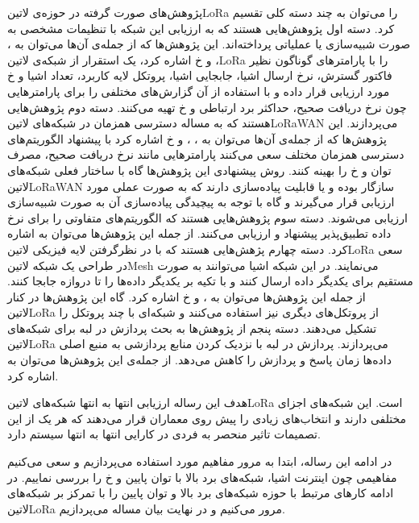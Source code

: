 پژوهش‌های صورت گرفته در حوزه‌ی ‌لاتین{LoRa} را می‌توان به چند دسته کلی تقسیم کرد. دسته اول پژوهش‌هایی هستند که به ارزیابی این شبکه با تنظیمات مشخصی
به صورت شبیه‌سازی یا عملیاتی پرداخته‌اند. این پژوهش‌ها که از جمله‌ی آن‌ها می‌توان به ، ، 
و ‌خ اشاره کرد، یک استقرار از شبکه‌ی ‌لاتین{LoRa}
را با پارامترهای گوناگون نظیر فاکتور گسترش، نرخ ارسال اشیا، جابجایی اشیا، پروتکل لایه کاربرد، تعداد اشیا و ‌خ مورد ارزیابی قرار داده و با استفاده از آن گزارش‌های مختلفی را
برای پارامترهایی چون نرخ دریافت صحیح، حداکثر برد ارتباطی و ‌خ تهیه می‌کنند.
دسته دوم پژوهش‌هایی هستند که به مساله دسترسی همزمان در شبکه‌های ‌لاتین{LoRaWAN} می‌پردازند. این پژوهش‌ها که از جمله‌ی آن‌ها می‌توان به ، ،  و ‌خ
اشاره کرد با پیشنهاد الگوریتم‌های دسترسی همزمان مختلف سعی می‌کنند پارامترهایی مانند نرخ دریافت صحیح، مصرف توان و ‌خ را بهینه کنند. روش پیشنهادی این پژوهش‌ها گاه با ساختار فعلی
شبکه‌های ‌لاتین{LoRaWAN} سازگار بوده و یا قابلیت پیاده‌سازی دارند که به صورت عملی مورد ارزیابی قرار می‌گیرند و گاه با توجه به پیچیدگی پیاده‌سازی آن به صورت شبیه‌سازی ارزیابی می‌شوند.
دسته سوم پژوهش‌هایی هستند که الگوریتم‌های متفاوتی را برای نرخ داده تطبیق‌پذیر پیشنهاد و ارزیابی می‌کنند. از جمله این پژوهش‌ها می‌توان به  اشاره کرد.
دسته چهارم پژهش‌هایی هستند که با در نظرگرفتن لایه فیزیکی ‌لاتین{LoRa} سعی در طراحی یک شبکه ‌لاتین{Mesh} می‌نمایند. در این شبکه اشیا می‌توانند
به صورت مستقیم برای یکدیگر داده ارسال کنند و با تکیه بر یکدیگر داده‌ها را تا دروازه جابجا کنند. از جمله این پژوهش‌ها می‌توان به ،  و ‌خ اشاره کرد.
گاه این پژوهش‌ها در کنار ‌لاتین{LoRa} از پروتکل‌های دیگری نیز استفاده می‌کنند و شبکه‌ای با چند پروتکل را تشکیل می‌دهند.
دسته پنجم از پژوهش‌ها به بحث پردازش در لبه برای شبکه‌های ‌لاتین{LoRa} می‌پردازند. پردازش در لبه با نزدیک کردن منابع پردازشی به منبع اصلی داده‌ها زمان پاسخ و پردازش را کاهش می‌دهد.
از جمله‌ی این پژوهش‌ها می‌توان به  اشاره کرد.

هدف این رساله ارزیابی انتها به انتها شبکه‌های ‌لاتین{LoRa} است. این شبکه‌های اجزای مختلفی دارند و انتخاب‌های زیادی را پیش روی معماران قرار می‌دهند که هر یک از این تصمیمات
تاثیر منحصر به فردی در کارایی انتها به انتها سیستم دارد.

در ادامه این رساله، ابتدا به مرور مفاهیم مورد استفاده می‌پردازیم و سعی می‌کنیم مفاهیمی چون اینترنت اشیا، شبکه‌های برد بالا با توان پایین و ‌خ را بررسی نماییم. در ادامه
کارهای مرتبط با حوزه شبکه‌های برد بالا و توان پایین را با تمرکز بر شبکه‌های ‌لاتین{LoRa} مرور می‌کنیم و در نهایت بیان مساله می‌پردازیم.
